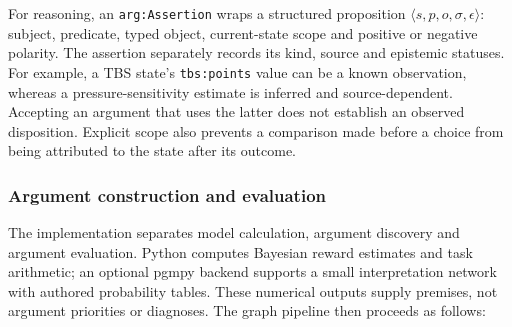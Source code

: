 \documentclass[11pt,a4paper]{article}
\begin{document}
For reasoning, an \texttt{arg:Assertion} wraps a structured proposition $\langle s,p,o,\sigma,\epsilon\rangle$: subject, predicate, typed object, current-state scope and positive or negative polarity. The assertion separately records its kind, source and epistemic statuses. For example, a TBS state's \texttt{tbs:points} value can be a known observation, whereas a pressure-sensitivity estimate is inferred and source-dependent. Accepting an argument that uses the latter does not establish an observed disposition. Explicit scope also prevents a comparison made before a choice from being attributed to the state after its outcome.

\subsubsection{Argument construction and evaluation}
The implementation separates model calculation, argument discovery and argument evaluation. Python computes Bayesian reward estimates and task arithmetic; an optional pgmpy backend supports a small interpretation network with authored probability tables. These numerical outputs supply premises, not argument priorities or diagnoses. The graph pipeline then proceeds as follows:
\end{document}
